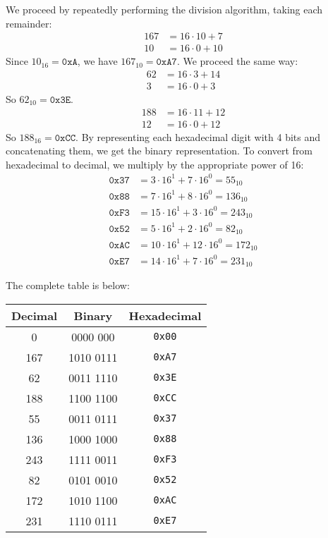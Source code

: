 \documentclass[12pt]{article}
\newenvironment{sol}[1][Solution]{\begin{trivlist}
		\item[\hskip \labelsep {\bfseries #1:}]}{\end{trivlist}}
\begin{document}
\begin{sol}
	We proceed by repeatedly performing the division algorithm, taking each remainder:
	\begin{align*}
		167 &= 16\cdot 10 + 7\\
		10 &= 16 \cdot 0 +10
	\end{align*}
	Since $10_{16}=\texttt{0xA}$, we have $167_{10}=\texttt{0xA7}$. We proceed
	the same way:
	\begin{align*}
		62 &= 16 \cdot 3 + 14\\
		3 &= 16 \cdot 0 + 3
	\end{align*}
	So $62_{10}=\texttt{0x3E}$.
	\begin{align*}
		188&=16\cdot 11 + 12\\
		12 &=16\cdot 0 + 12
	\end{align*}
	So $188_{16}=\texttt{0xCC}$. By representing each hexadecimal digit with
	4 bits and concatenating them, we get the binary representation. To convert
	from hexadecimal to decimal, we multiply by the appropriate power of 16:
	\begin{align*}
		\texttt{0x37}&=3\cdot 16^1+7\cdot 16^0=55_{10}\\
		\texttt{0x88}&=7\cdot 16^1+8\cdot 16^0=136_{10}\\
		\texttt{0xF3}&=15\cdot16^1+3\cdot 16^0=243_{10}\\
		\texttt{0x52}&=5\cdot 16^1+2\cdot 16^0=82_{10}\\
		\texttt{0xAC}&=10\cdot16^1+12\cdot 16^0=172_{10}\\
		\texttt{0xE7}&=14\cdot16^1+7\cdot 16^0=231_{10}
	\end{align*}
	
	The complete table is below:
	\begin{center}
		\begin{tabular}{ccc}
			Decimal & Binary & Hexadecimal\\
			\hline
			0 & 0000 000 & \texttt{0x00}\\
			167 & 1010 0111& \texttt{0xA7}\\
			62 & 0011 1110 & \texttt{0x3E}\\
			188 & 1100 1100 & \texttt{0xCC}\\
			55 & 0011 0111 & \texttt{0x37}\\
			136 & 1000 1000 & \texttt{0x88}\\
			243 & 1111 0011 & \texttt{0xF3}\\
			82 & 0101 0010 & \texttt{0x52}\\
			172 & 1010 1100 & \texttt{0xAC}\\
			231 & 1110 0111 & \texttt{0xE7}	
		\end{tabular}
	\end{center}
\end{sol}
\end{document}
